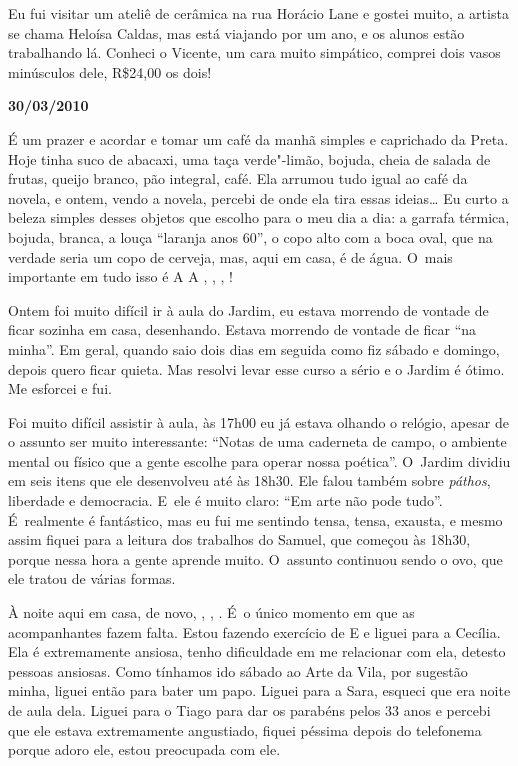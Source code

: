 Eu fui visitar um ateliê de cerâmica na rua Horácio Lane e gostei muito,
a artista se chama Heloísa Caldas, mas está viajando por um ano, e os
alunos estão trabalhando lá. Conheci o Vicente, um cara muito simpático,
comprei dois vasos minúsculos dele, R\$24,00 os dois!

\begin{flushright}\textbf{30/03/2010}\end{flushright}


É um prazer e acordar e tomar um café da manhã simples e caprichado da
Preta. Hoje tinha suco de abacaxi, uma taça verde"-limão, bojuda, cheia
de salada de frutas, queijo branco, pão integral, café. Ela arrumou tudo
igual ao café da novela, e ontem, vendo a novela, percebi de onde ela
tira essas ideias… Eu curto a beleza simples desses objetos que
escolho para o meu dia a dia: a garrafa térmica, bojuda, branca, a louça
``laranja anos 60'', o copo alto com a boca oval, que na verdade seria
um copo de cerveja, mas, aqui em casa, é de água. O~mais importante em
tudo isso é   A      
   A , , , !

Ontem foi muito difícil ir à aula do Jardim, eu estava morrendo de
vontade de ficar sozinha em casa, desenhando. Estava morrendo de vontade
de ficar ``na minha''. Em geral, quando saio dois dias em seguida como
fiz sábado e domingo, depois quero ficar quieta. Mas resolvi levar esse
curso a sério e o Jardim é ótimo. Me esforcei e fui.

Foi muito difícil assistir à aula, às 17h00 eu já estava olhando o
relógio, apesar de o assunto ser muito interessante: ``Notas de uma
caderneta de campo, o ambiente mental ou físico que a gente escolhe para
operar nossa poética''. O~Jardim dividiu em seis itens que ele
desenvolveu até às 18h30. Ele falou também sobre \emph{páthos},
liberdade e democracia. E~ele é muito claro: ``Em arte não pode tudo''.
É~realmente é fantástico, mas eu fui me sentindo tensa, tensa, exausta,
e mesmo assim fiquei para a leitura dos trabalhos do Samuel, que começou
às 18h30, porque nessa hora a gente aprende muito. O~assunto continuou
sendo o ovo, que ele tratou de várias formas.

À noite aqui em casa, de novo, , , . É~o único
momento em que as acompanhantes fazem falta. Estou fazendo exercício de
 E  e liguei para a Cecília. Ela é extremamente
ansiosa, tenho dificuldade em me relacionar com ela, detesto pessoas
ansiosas. Como tínhamos ido sábado ao Arte da Vila, por sugestão minha,
liguei então para bater um papo. Liguei para a Sara, esqueci que era
noite de aula dela. Liguei para o Tiago para dar os parabéns pelos 33
anos e percebi que ele estava extremamente angustiado, fiquei péssima
depois do telefonema porque adoro ele, estou preocupada com ele.

